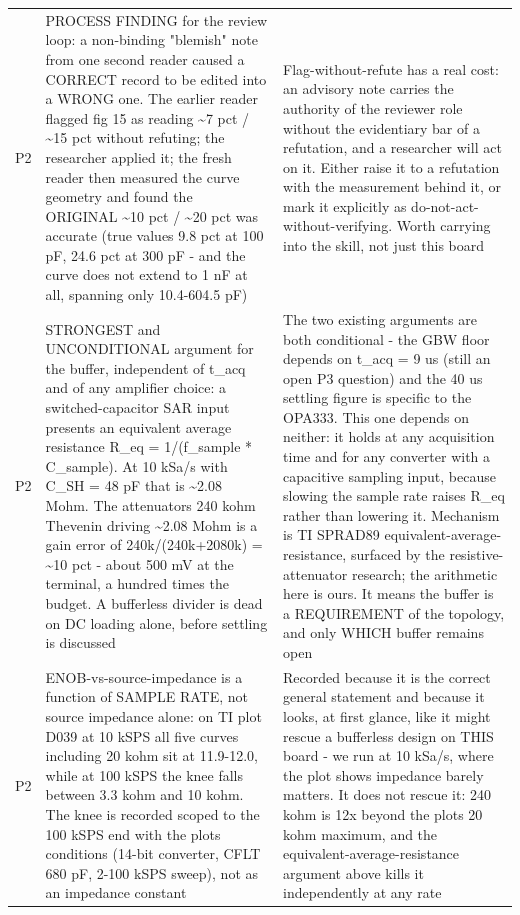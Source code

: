 \documentclass[11pt,a4paper]{article}
\begin{document}
{\begin{longtable}{lp{5.2cm}p{7.2cm}}
P2 & PROCESS FINDING for the review loop: a non-binding "blemish" note from one second reader caused a CORRECT record to be edited into a WRONG one. The earlier reader flagged fig 15 as reading \textasciitilde{}7 pct / \textasciitilde{}15 pct without refuting; the researcher applied it; the fresh reader then measured the curve geometry and found the ORIGINAL \textasciitilde{}10 pct / \textasciitilde{}20 pct was accurate (true values 9.8 pct at 100 pF, 24.6 pct at 300 pF - and the curve does not extend to 1 nF at all, spanning only 10.4-604.5 pF) & Flag-without-refute has a real cost: an advisory note carries the authority of the reviewer role without the evidentiary bar of a refutation, and a researcher will act on it. Either raise it to a refutation with the measurement behind it, or mark it explicitly as do-not-act-without-verifying. Worth carrying into the skill, not just this board \\
P2 & STRONGEST and UNCONDITIONAL argument for the buffer, independent of t\_acq and of any amplifier choice: a switched-capacitor SAR input presents an equivalent average resistance R\_eq = 1/(f\_sample {*} C\_sample). At 10 kSa/s with C\_SH = 48 pF that is \textasciitilde{}2.08 Mohm. The attenuators 240 kohm Thevenin driving \textasciitilde{}2.08 Mohm is a gain error of 240k/(240k+2080k) = \textasciitilde{}10 pct - about 500 mV at the terminal, a hundred times the budget. A bufferless divider is dead on DC loading alone, before settling is discussed & The two existing arguments are both conditional - the GBW floor depends on t\_acq = 9 us (still an open P3 question) and the 40 us settling figure is specific to the OPA333. This one depends on neither: it holds at any acquisition time and for any converter with a capacitive sampling input, because slowing the sample rate raises R\_eq rather than lowering it. Mechanism is TI SPRAD89 equivalent-average-resistance, surfaced by the resistive-attenuator research; the arithmetic here is ours. It means the buffer is a REQUIREMENT of the topology, and only WHICH buffer remains open \\
P2 & ENOB-vs-source-impedance is a function of SAMPLE RATE, not source impedance alone: on TI plot D039 at 10 kSPS all five curves including 20 kohm sit at 11.9-12.0, while at 100 kSPS the knee falls between 3.3 kohm and 10 kohm. The knee is recorded scoped to the 100 kSPS end with the plots conditions (14-bit converter, CFLT 680 pF, 2-100 kSPS sweep), not as an impedance constant & Recorded because it is the correct general statement and because it looks, at first glance, like it might rescue a bufferless design on THIS board - we run at 10 kSa/s, where the plot shows impedance barely matters. It does not rescue it: 240 kohm is 12x beyond the plots 20 kohm maximum, and the equivalent-average-resistance argument above kills it independently at any rate \\

\end{longtable}}
\end{document}
